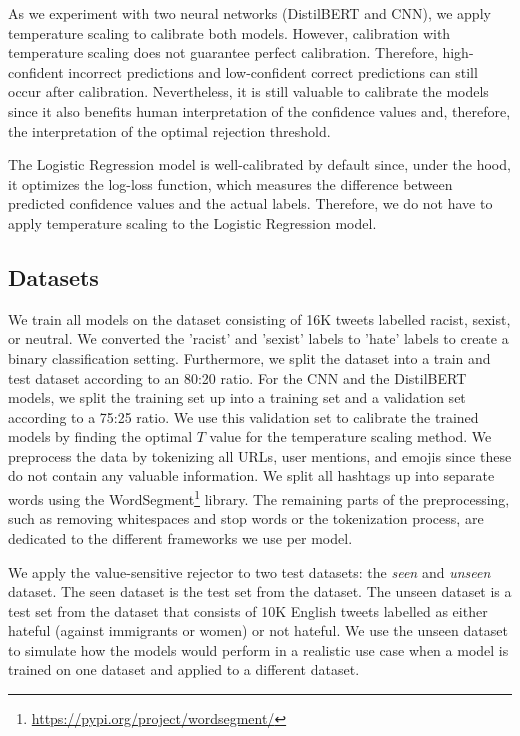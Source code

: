 %
As we experiment with two neural networks (DistilBERT and CNN), we apply temperature scaling to calibrate both models.
%
However, calibration with temperature scaling does not guarantee perfect calibration.
%
Therefore, high-confident incorrect predictions and low-confident correct predictions can still occur after calibration.
%
Nevertheless, it is still valuable to calibrate the models since it also benefits human interpretation of the confidence values and, therefore, the interpretation of the optimal rejection threshold.
%

%
The Logistic Regression model is well-calibrated by default since, under the hood, it optimizes the log-loss function, which measures the difference between predicted confidence values and the actual labels.
%
Therefore, we do not have to apply temperature scaling to the Logistic Regression model.

\subsection{Datasets}
We train all models on the \citet{waseem2016hateful} dataset consisting of 16K tweets labelled racist, sexist, or neutral.
%
We converted the 'racist' and 'sexist' labels to 'hate' labels to create a binary classification setting.
%
Furthermore, we split the dataset into a train and test dataset according to an 80:20 ratio.
%
For the CNN and the DistilBERT models, we split the training set up into a training set and a validation set according to a 75:25 ratio.
%
We use this validation set to calibrate the trained models by finding the optimal $T$ value for the temperature scaling method.
%
We preprocess the data by tokenizing all URLs, user mentions, and emojis since these do not contain any valuable information.
%
We split all hashtags up into separate words using the WordSegment\footnote{\url{https://pypi.org/project/wordsegment/}} library.
%
The remaining parts of the preprocessing, such as removing whitespaces and stop words or the tokenization process, are dedicated to the different frameworks we use per model.
%

%
We apply the value-sensitive rejector to two test datasets: the \emph{seen} and \textit{unseen} dataset.
%
The seen dataset is the test set from the \citet{waseem2016hateful} dataset.
%
The unseen dataset is a test set from the \citet{basile2019semeval} dataset that consists of 10K English tweets labelled as either hateful (against immigrants or women) or not hateful.
%
We use the unseen dataset to simulate how the models would perform in a realistic use case when a model is trained on one dataset and applied to a different dataset.
%

